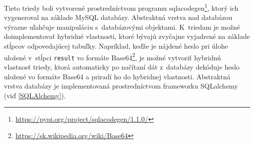 \documentclass[zadani,slovak]{fitthesis}
\begin{document}
\noindent
Tieto triedy boli vytvorené prostredníctvom programu sqlacodegen\footnote{\url{https://pypi.org/project/sqlacodegen/1.1.0/}}, ktorý ich vygeneroval na základe MySQL databázy. Abstraktná vrstva nad databázou výrazne uľahčuje manipuláciu s~databázovými objektami. K~triedam je možné doimplementovať hybridné vlastnosti, ktoré bývajú zvyčajne vyjadrené na základe stĺpcov odpovedajúcej tabuľky. Napríklad, keďže je nájdené heslo pri úlohe uložené v~stĺpci \texttt{result} vo formáte Base64\footnote{\url{https://sk.wikipedia.org/wiki/Base64}}, je možné vytvoriť hybridnú vlastnosť triedy, ktorá automaticky po načítaní dát z~databázy dekóduje heslo uložené vo formáte Base64 a priradí ho do hybridnej vlastnosti. Abstraktná vrstva databázy je implementovaná prostredníctvom frameworku SQLalchemy (viď \ref{SQLAlchemy}).
\end{document}
